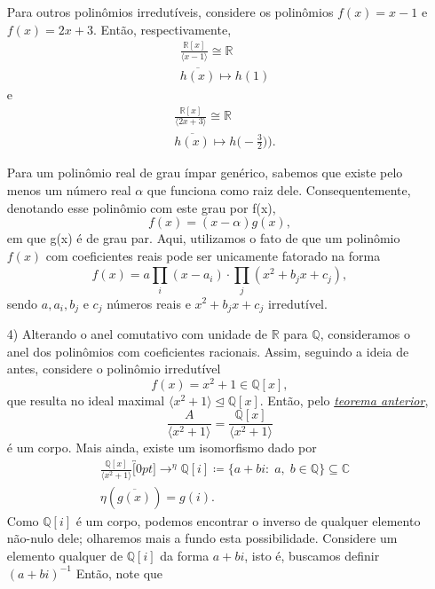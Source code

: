 \documentclass[../algebraIII_notes.tex]{subfiles}
\begin{document}
\begin{example}
\begin{itemize}
		      Para outros polinômios irredutíveis, considere os polinômios \(f(x) = x - 1\) e \(f(x) = 2x + 3\). Então, respectivamente,
		      \begin{align*}
			       & \frac{\mathbb{R}[x]}{\langle x-1 \rangle}\cong \mathbb{R} \\
			       & \overline{h(x)}\longmapsto{h(1)}
		      \end{align*}
		      e
		      \begin{align*}
			       & \frac{\mathbb{R}[x]}{\langle 2x+3 \rangle}\cong \mathbb{R} \\
			       & \overline{h(x)}\mapsto h \biggl(-\frac{3}{2})\biggr).
		      \end{align*}

		      Para um polinômio real de grau ímpar genérico, sabemos que existe pelo menos um número real \(\alpha \) que funciona como raiz dele. Consequentemente, denotando esse polinômio com este grau por f(x),
		      \[
			      f(x) = (x-\alpha )g(x),
		      \]
		      em que g(x) é de grau par. Aqui, utilizamos o fato de que um polinômio \(f(x)\) com coeficientes reais pode ser unicamente fatorado na forma
		      \[
			      f(x) = a \prod\limits_{i}^{}(x-a_{i}) \cdot \prod\limits_{j}^{}(x^{2}+b_{j}x+c_{j}),
		      \]
		      sendo \(a, a_{i}, b_{j}\) e \(c_{j}\) números reais e \(x^{2} + b_{j}x + c_{j}\) irredutível.
		\item[4)] Alterando o anel comutativo com unidade de \(\mathbb{R}\) para \(\mathbb{Q}\), consideramos o anel dos polinômios com coeficientes racionais. Assim, seguindo a ideia de antes, considere o polinômio irredutível
		      \[
			      f(x) = x^{2} + 1\in \mathbb{Q}[x],
		      \]
		      que resulta no ideal maximal \(\langle x^{2}+1 \rangle \trianglelefteq \mathbb{Q}[x]\). Então, pelo \hyperlink{field_generator}{\textit{teorema anterior}},
		      \[
			      \frac{A}{\langle x^{2}+1 \rangle} = \frac{\mathbb{Q}[x]}{\langle x^{2}+1 \rangle}
		      \]
		      é um corpo. Mais ainda, existe um isomorfismo dado por
		      \begin{align*}
			       & \frac{\mathbb{Q}[x]}{\langle x^{2}+1 \rangle}\overbracket[0pt]{\rightarrow}^{\eta }\mathbb{Q}[i]\coloneqq \{a+bi: \;a,\; b\in \mathbb{Q}\}\subseteq \mathbb{C} \\
			       & \eta (\overline{g(x)}) = g(i).
		      \end{align*}
		      Como \(\mathbb{Q}[i]\) é um corpo, podemos encontrar o inverso de qualquer elemento não-nulo dele; olharemos mais a fundo esta possibilidade. Considere um elemento qualquer de \(\mathbb{Q}[i]\) da forma \(a + bi\), isto é, buscamos definir \((a+bi)^{-1}\) Então, note que

\end{itemize}
\end{example}
\end{document}

